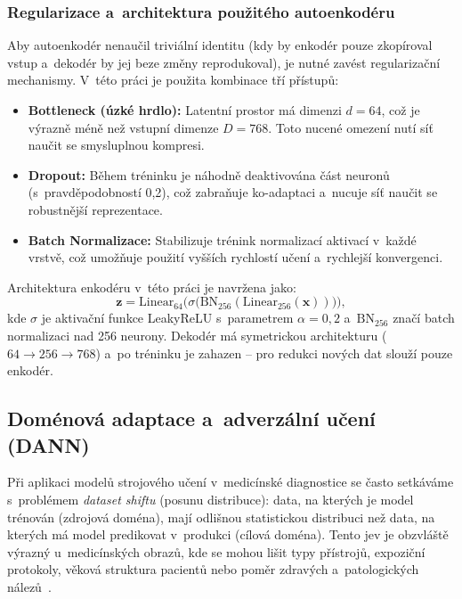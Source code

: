 \documentclass[12pt, a4paper]{report}
\begin{document}
\subsubsection{Regularizace a~architektura použitého autoenkodéru}

Aby autoenkodér nenaučil triviální identitu (kdy by enkodér pouze zkopíroval vstup a~dekodér by jej beze změny reprodukoval), je nutné zavést regularizační mechanismy. V~této práci je použita kombinace tří přístupů:

\begin{itemize}
    \item \textbf{Bottleneck (úzké hrdlo):} Latentní prostor má dimenzi $d = 64$, což je výrazně méně než vstupní dimenze $D = 768$. Toto nucené omezení nutí síť naučit se smysluplnou kompresi.
    \item \textbf{Dropout:} Během tréninku je náhodně deaktivována část neuronů (s~pravděpodobností 0,2), což zabraňuje ko-adaptaci a~nucuje síť naučit se robustnější reprezentace.
    \item \textbf{Batch Normalizace:} Stabilizuje trénink normalizací aktivací v~každé vrstvě, což umožňuje použití vyšších rychlostí učení a~rychlejší konvergenci.
\end{itemize}

Architektura enkodéru v~této práci je navržena jako:
\begin{equation}
    \mathbf{z} = \text{Linear}_{64} \Big( \sigma \big( \text{BN}_{256}(\text{Linear}_{256}(\mathbf{x})) \big) \Big),
\end{equation}
kde $\sigma$ je aktivační funkce LeakyReLU s~parametrem $\alpha = 0{,}2$ a~$\text{BN}_{256}$ značí batch normalizaci nad 256 neurony. Dekodér má symetrickou architekturu ($64 \to 256 \to 768$) a~po tréninku je zahazen -- pro redukci nových dat slouží pouze enkodér.

\subsection{Doménová adaptace a~adverzální učení (DANN)} \label{subsec:dann_theory}

Při aplikaci modelů strojového učení v~medicínské diagnostice se často setkáváme s~problémem \textit{dataset shiftu} (posunu distribuce): data, na kterých je model trénován (zdrojová doména), mají odlišnou statistickou distribuci než data, na kterých má model predikovat v~produkci (cílová doména). Tento jev je obzvláště výrazný u~medicínských obrazů, kde se mohou lišit typy přístrojů, expoziční protokoly, věková struktura pacientů nebo poměr zdravých a~patologických nálezů~\cite{domain_shift_chestxray}.
\end{document}
